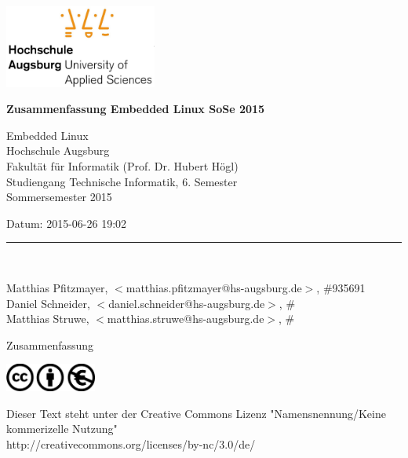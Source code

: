 




















\ \ 
\hfill
\begin{minipage}[t]{5cm}
\includegraphics[width=5cm]{img/hsa-logo.jpg}
\end{minipage}

\vskip 10mm

{\parindent=0pt

\thispagestyle{empty}


{\Large\bf Zusammenfassung Embedded Linux SoSe 2015
}

\vskip 5mm

Embedded Linux \\
Hochschule Augsburg \\
Fakultät für Informatik (Prof. Dr. Hubert Högl) \\
Studiengang Technische Informatik, 6. Semester \\

Sommersemester 2015
 

Datum: 2015-06-26 19:02 \\

\medskip

\rule{10cm}{4pt}\\

\medskip

Matthias Pfitzmayer, $<$matthias.pfitzmayer@hs-augsburg.de$>$, \#935691 \\
Daniel Schneider, $<$daniel.schneider@hs-augsburg.de$>$, \# \\
Matthias Struwe, $<$matthias.struwe@hs-augsburg.de$>$, \# \\


\vskip 2cm

\begin{center}
{\LARGE\bf

Zusammenfassung

}
\end{center}

\vfill

\begin{minipage}[t]{3cm}
\includegraphics[width=3cm]{img/cc-logo.jpg}
\end{minipage}

{\small
Dieser Text steht unter der Creative Commons Lizenz "Namensnennung/Keine kommerizelle Nutzung"\\
http://creativecommons.org/licenses/by-nc/3.0/de/
}

} %


\newpage
